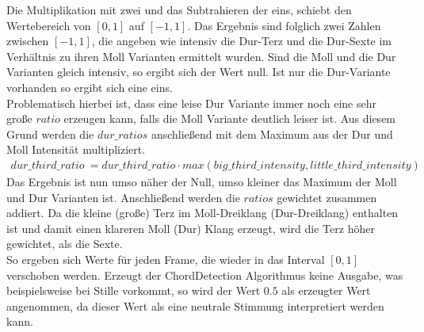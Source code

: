 \documentclass[11pt,a4paper]{article}
\begin{document}
\noindent
Die Multiplikation mit zwei und das Subtrahieren der eins, schiebt den Wertebereich von $[0, 1]$ auf $[-1, 1]$. Das Ergebnis sind folglich zwei Zahlen zwischen $[-1, 1]$, die angeben wie intensiv die Dur-Terz und die Dur-Sexte im Verhältnis zu ihren Moll Varianten ermittelt wurden. Sind die Moll und die Dur Varianten gleich intensiv, so ergibt sich der Wert null. Ist nur die Dur-Variante vorhanden so ergibt sich eine eins.\\
Problematisch hierbei ist, dass eine leise Dur Variante immer noch eine sehr große $ratio$ erzeugen kann, falls die Moll Variante deutlich leiser ist. Aus diesem Grund werden die $dur\_ratios$ anschließend mit dem Maximum aus der Dur und Moll Intensität multipliziert.
\begin{align}
dur\_third\_ratio\ = dur\_third\_ratio \cdot max(big\_third\_intensity, little\_third\_intensity)
\end{align}
\noindent
Das Ergebnis ist nun umso näher der Null, umso kleiner das Maximum der Moll und Dur Varianten ist. Anschließend werden die $ratios$ gewichtet zusammen addiert. Da die kleine (große) Terz im Moll-Dreiklang (Dur-Dreiklang) enthalten ist und damit einen klareren Moll (Dur) Klang erzeugt, wird die Terz höher gewichtet, als die Sexte.\\
So ergeben sich Werte für jeden Frame, die wieder in das Interval $[0, 1]$ verschoben werden. Erzeugt der ChordDetection Algorithmus keine Ausgabe, was beispielsweise bei Stille vorkommt, so wird der Wert $0.5$ als erzeugter Wert angenommen, da dieser Wert als eine neutrale Stimmung interpretiert werden kann.
\end{document}
